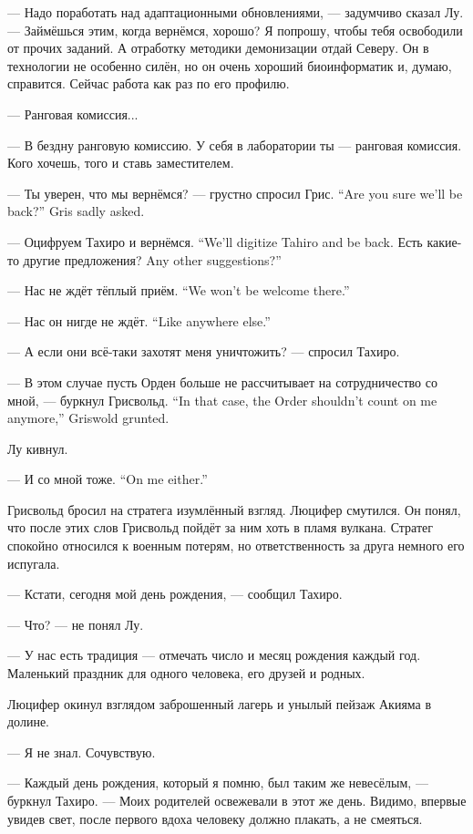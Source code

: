 --- Надо поработать над адаптационными обновлениями, --- задумчиво сказал Лу.
--- Займёшься этим, когда вернёмся, хорошо?
Я попрошу, чтобы тебя освободили от прочих заданий.
А отработку методики демонизации отдай Северу.
Он в технологии не особенно силён, но он очень хороший биоинформатик и, думаю, справится.
Сейчас работа как раз по его профилю.

--- Ранговая комиссия...

--- В бездну ранговую комиссию.
У себя в лаборатории ты --- ранговая комиссия.
Кого хочешь, того и ставь заместителем.

{--- Ты уверен, что мы вернёмся? --- грустно спросил Грис.}
{``Are you sure we'll be back?'' Gris sadly asked.}

{--- Оцифруем Тахиро и вернёмся.}
{``We'll digitize Tahiro and be back.}
{Есть какие-то другие предложения?}
{Any other suggestions?''}

{--- Нас не ждёт тёплый приём.}
{``We won't be welcome there.''}

{--- Нас он нигде не ждёт.}
{``Like anywhere else.''}

--- А если они всё-таки захотят меня уничтожить? --- спросил Тахиро.

{--- В этом случае пусть Орден больше не рассчитывает на сотрудничество со мной, --- буркнул Грисвольд.}
{``In that case, the Order shouldn't count on me anymore,'' Griswold grunted.}

Лу кивнул.

{--- И со мной тоже.}
{``On me either.''}

Грисвольд бросил на стратега изумлённый взгляд.
Люцифер смутился.
Он понял, что после этих слов Грисвольд пойдёт за ним хоть в пламя вулкана.
Стратег спокойно относился к военным потерям, но ответственность за друга немного его испугала.

--- Кстати, сегодня мой день рождения, --- сообщил Тахиро.

--- Что? --- не понял Лу.

--- У нас есть традиция --- отмечать число и месяц рождения каждый год.
Маленький праздник для одного человека, его друзей и родных.

Люцифер окинул взглядом заброшенный лагерь и унылый пейзаж Акияма в долине.

--- Я не знал.
Сочувствую.

--- Каждый день рождения, который я помню, был таким же невесёлым, --- буркнул Тахиро.
--- Моих родителей освежевали в этот же день.
Видимо, впервые увидев свет, после первого вдоха человеку должно плакать, а не смеяться.

